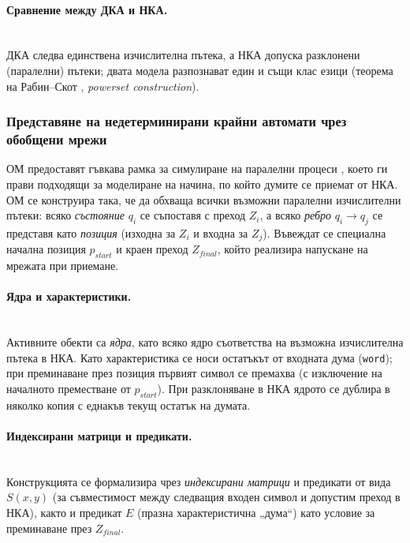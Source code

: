 \paragraph*{Сравнение между ДКА и НКА.}
\mbox{}\\
ДКА следва единствена изчислителна пътека, а НКА допуска разклонени (паралелни) пътеки; двата модела разпознават един и същи клас езици (теорема на Рабин–Скот \cite{DIS-rabin-scott}, \textit{powerset construction}).

\subsubsection{Представяне на недетерминирани крайни автомати чрез обобщени мрежи}
\label{sec:simulating_automata_gn-avtoreferat}

\hspace*{2.5em}ОМ предоставят гъвкава рамка за симулиране на паралелни процеси \cite{DIS-Z1,DIS-BAM}, което ги прави подходящи за моделиране на начина, по който думите се приемат от НКА. ОМ се конструира така, че да обхваща всички възможни паралелни изчислителни пътеки: всяко \emph{състояние} $q_i$ се съпоставя с преход $Z_i$, а всяко \emph{ребро} $q_i \to q_j$ се представя като \emph{позиция} (изходна за $Z_i$ и входна за $Z_j$). Въвеждат се специална начална позиция $p_{\textit{start}}$ и краен преход $Z_{\textit{final}}$, който реализира напускане на мрежата при приемане.

\paragraph*{Ядра и характеристики.}
\mbox{}\\
Активните обекти са \emph{ядра}, като всяко ядро съответства на възможна изчислителна пътека в НКА. Като характеристика се носи остатъкът от входната дума (\texttt{word}); при преминаване през позиция първият символ се премахва (с изключение на началното преместване от $p_{\textit{start}}$). При разклоняване в НКА ядрото се дублира в няколко копия с еднакъв текущ остатък на думата.

\paragraph*{Индексирани матрици и предикати.}
\mbox{}\\
Конструкцията се формализира чрез \emph{индексирани матрици} и предикати от вида $S(x,y)$ (за съвместимост между следващия входен символ и допустим преход в НКА), както и предикат $E$ (празна характеристична „дума“) като условие за преминаване през $Z_{\textit{final}}$.

